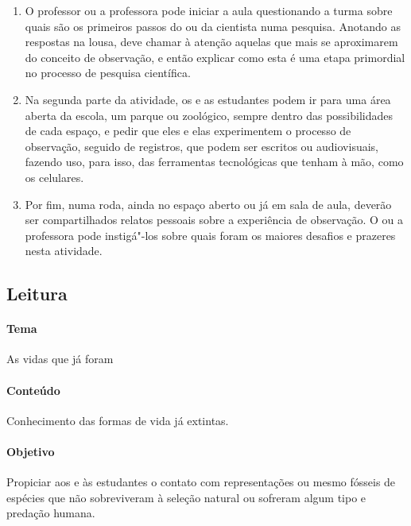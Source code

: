 \documentclass[11pt]{extarticle}
\begin{document}
\begin{enumerate}

	\item
	O professor ou a professora pode iniciar a aula questionando a turma sobre quais
	são os primeiros passos do ou da cientista numa pesquisa. Anotando as respostas
	na lousa, deve chamar à atenção aquelas que mais se aproximarem do conceito 
	de observação, e então explicar como esta é uma etapa primordial
	no processo de pesquisa científica.

	\item
	Na segunda parte da atividade, os e as estudantes podem ir 
	para uma área aberta da escola, um parque ou zoológico, sempre dentro
	das possibilidades de cada espaço, e pedir que eles e elas experimentem
	o processo de observação, seguido de registros, que podem ser
	escritos ou audiovisuais, fazendo uso, para isso, das ferramentas tecnológicas
	que tenham à mão, como os celulares.

	\item
	Por fim, numa roda, ainda no espaço aberto ou já em sala de aula,
	deverão ser compartilhados relatos pessoais sobre a experiência de observação.
	O ou a professora pode instigá"-los sobre quais foram os maiores desafios e 
	prazeres nesta atividade.
\end{enumerate}






\subsection{Leitura}

\paragraph{Tema} As vidas que já foram

\paragraph{Conteúdo} Conhecimento das formas de vida já extintas.

\paragraph{Objetivo} Propiciar aos e às estudantes o contato com representações
ou mesmo fósseis de espécies que não sobreviveram à seleção natural ou sofreram
algum tipo e predação humana. 
\end{document}
